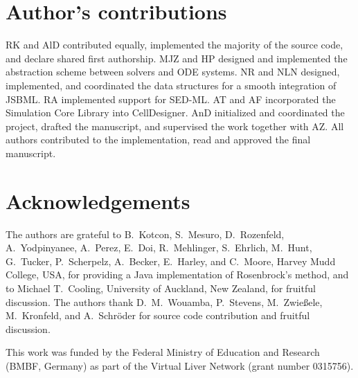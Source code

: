 \documentclass[10pt]{bmc_article}
\newenvironment{bmcformat}{\fussy\setboolean{publ}{true}}{\fussy}
\begin{document}
\begin{bmcformat}
\section*{Author's contributions}
RK and AlD contributed equally, implemented the majority of the source code, and declare shared first authorship.
MJZ and HP designed and implemented the abstraction scheme between solvers and \acs{ODE} systems.
NR and NLN designed, implemented, and coordinated the data structures for a smooth integration of JSBML.
RA implemented support for \acs{SED-ML}. AT and AF incorporated the Simulation Core Library into CellDesigner.
AnD initialized and coordinated the project, drafted the manuscript, and supervised the work together with AZ.
All authors contributed to the implementation, read and approved the final manuscript.    

\section*{Acknowledgements}
The authors are grateful to B.~Kotcon, S.~Mesuro, D.~Rozenfeld, A.~Yodpinyanee,
A.~Perez, E.~Doi, R.~Mehlinger, S.~Ehrlich, M.~Hunt, G.~Tucker, P.~Scherpelz,
A.~Becker, E.~Harley, and C.~Moore, Harvey Mudd College, USA, for providing a
Java implementation of Rosenbrock's method, and to Michael T.~Cooling,
University of Auckland, New Zealand, for fruitful discussion. The authors thank
D.~M.~Wouamba, P.~Stevens, M.~Zwie\ss{}ele, M.~Kronfeld, and A.~Schr\"oder for
source code contribution and fruitful discussion.

This work was funded by the Federal Ministry of Education and Research (BMBF,
Germany) as part of the Virtual Liver Network (grant number 0315756).
 


\end{bmcformat}
\end{document}
